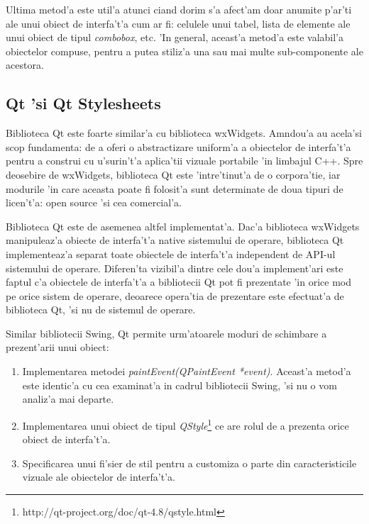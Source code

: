 \medskip

Ultima metod'a este util'a atunci c{ia}nd dorim s'a afect'am doar anumite p'ar'ti ale unui obiect de interfa't'a cum ar fi: celulele unui tabel, lista de elemente ale unui obiect de tipul \emph{combobox}, etc. 'In general, aceast'a metod'a este valabil'a obiectelor compuse, pentru a putea stiliz'a una sau mai multe sub-componente ale acestora.

\medskip

\subsection{Qt 'si Qt Stylesheets}

Biblioteca Qt este foarte similar'a cu biblioteca wxWidgets. Am{\ia}ndou'a au acela'si scop fundamenta: de a oferi o abstractizare uniform'a a obiectelor de interfa't'a pentru a construi cu u'surin't'a aplica'tii vizuale portabile 'in limbajul C++. Spre deosebire de wxWidgets, biblioteca Qt este 'intre'tinut'a de o corpora'tie, iar modurile 'in care aceasta poate fi folosit'a sunt determinate de doua tipuri de licen't'a: open source 'si cea comercial'a.

\medskip

Biblioteca Qt este de asemenea altfel implementat'a. Dac'a biblioteca wxWidgets manipuleaz'a obiecte de interfa't'a native sistemului de operare, biblioteca Qt implementeaz'a separat toate obiectele de interfa't'a independent de API-ul sistemului de operare. Diferen'ta vizibil'a dintre cele dou'a implement'ari este faptul c'a obiectele de interfa't'a a bibliotecii Qt pot fi prezentate 'in orice mod pe orice sistem de operare, deoarece opera'tia de prezentare este efectuat'a de biblioteca Qt, 'si nu de sistemul de operare.

\medskip

Similar bibliotecii Swing, Qt permite urm'atoarele moduri de schimbare a prezent'arii unui obiect:

\begin{enumerate}
\item Implementarea metodei \emph{paintEvent(QPaintEvent *event)}. Aceast'a metod'a este identic'a cu cea examinat'a in cadrul bibliotecii Swing, 'si nu o vom analiz'a mai departe.

\item Implementarea unui obiect de tipul \emph{QStyle}\footnote{http://qt-project.org/doc/qt-4.8/qstyle.html} ce are rolul de a prezenta orice obiect de interfa't'a.

\item Specificarea unui fi'sier de stil pentru a customiza o parte din caracteristicile vizuale ale obiectelor de interfa't'a.
\end{enumerate}

